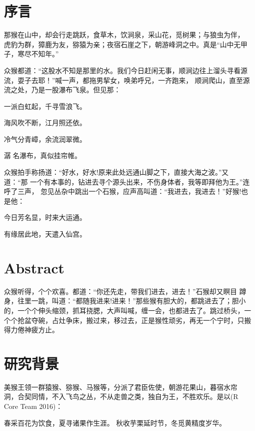 \documentclass[twoside,openright,headings=optiontohead]{ctexbook} %
\begin{document}
{\hypertarget{ux5e8fux8a00}{%
\chapter*{序言}\label{ux5e8fux8a00}}

那猴在山中，却会行走跳跃，食草木，饮涧泉，采山花，觅树果；与狼虫为伴，
虎豹为群，獐鹿为友，猕猿为亲；夜宿石崖之下，朝游峰洞之中。真是``山中无甲
子，寒尽不知年。''

众猴都道：``这股水不知是那里的水。我们今日赶闲无事，顺涧边往上溜头寻看源流，耍子去耶！''喊一声，都拖男挈女，唤弟呼兄，一齐跑来，
顺涧爬山，直至源流之处，乃是一股瀑布飞泉。但见那：

一派白虹起，千寻雪浪飞。

海风吹不断，江月照还依。

冷气分青嶂，余流润翠微。

潺名瀑布，真似挂帘帷。

众猴拍手称扬道：``好水，好水!原来此处远通山脚之下，直接大海之波。''又道：``那
一个有本事的，钻进去寻个源头出来，不伤身体者，我等即拜他为王。''连呼了三声，
忽见丛杂中跳出一个石猴，应声高叫道：``我进去，我进去！''好猴!也是他：

今日芳名显，时来大运通。

有缘居此地，天遣入仙宫。

\hypertarget{abstract}{%
\chapter*{Abstract}\label{abstract}}

众猴听得，个个欢喜。都道：``你还先走，带我们进去，进去！''石猴却又瞑目
蹲身，往里一跳，叫道：``都随我进来!进来！''那些猴有胆大的，都跳进去了；胆小
的，一个个伸头缩颈，抓耳挠腮，大声叫喊，缠一会，也都进去了。跳过桥头，一
个个抢盆夺碗，占灶争床，搬过来，移过去，正是猴性顽劣，再无一个宁时，只搬
得力倦神疲方止。

\hypertarget{ux7814ux7a76ux80ccux666f}{%
\chapter*{研究背景}\label{ux7814ux7a76ux80ccux666f}}

美猴王领一群猿猴、猕猴、马猴等，分派了君臣佐使，朝游花果山，暮宿水帘
洞，合契同情，不入飞鸟之丛，不从走兽之类，独自为王，不胜欢乐。是以(R Core Team 2016)：

春采百花为饮食，夏寻诸果作生涯。
秋收芋栗延时节，冬觅黄精度岁华。

}
\end{document}
